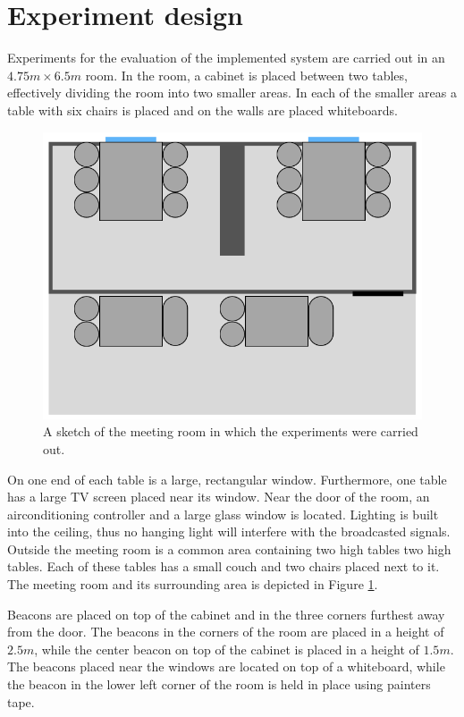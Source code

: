 \section{Experiment design}\label{sec:experiment_design}
Experiments for the evaluation of the implemented system are carried out in an $4.75m \times 6.5m$ room.
In the room, a cabinet is placed between two tables, effectively dividing the room into two smaller areas. 
In each of the smaller areas a table with six chairs is placed and on the walls are placed whiteboards.
\begin{figure}[h]
    \centering
    \includegraphics[scale=0.7]{images/experiment_room.png}
    \caption{A sketch of the meeting room in which the experiments were carried out.}
    \label{fig:experiment_room}
\end{figure}
On one end of each table is a large, rectangular window.
Furthermore, one table has a large TV screen placed near its window. 
Near the door of the room, an airconditioning controller and a large glass window is located.
Lighting is built into the ceiling, thus no hanging light will interfere with the broadcasted signals. 
Outside the meeting room is a common area containing two high tables two high tables.
Each of these tables has a small couch and two chairs placed next to it.
The meeting room and its surrounding area is depicted in Figure \ref{fig:experiment_room}.

Beacons are placed on top of the cabinet and in the three corners furthest away from the door. 
The beacons in the corners of the room are placed in a height of $2.5m$, while the center beacon on top of the cabinet is placed in a height of $1.5m$.   
The beacons placed near the windows are located on top of a whiteboard, while the beacon in the lower left corner of the room is held in place using painters tape. 

